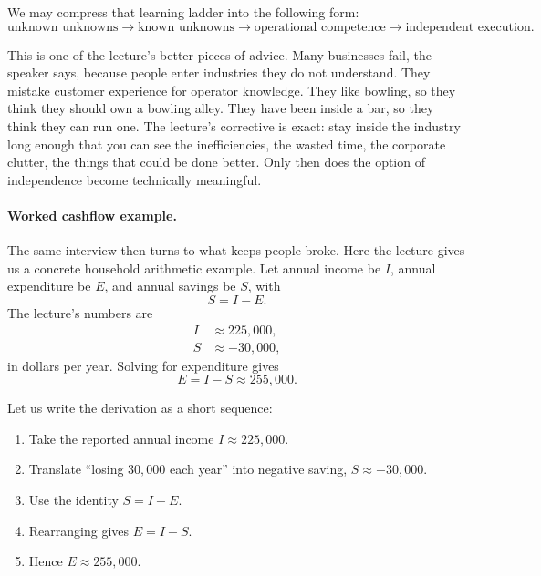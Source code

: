 We may compress that learning ladder into the following form:
\begin{equation}
\text{unknown unknowns} \to \text{known unknowns} \to \text{operational competence} \to \text{independent execution}.
\end{equation}

This is one of the lecture's better pieces of advice. Many businesses fail, the speaker says, because people enter industries they do not understand. They mistake customer experience for operator knowledge. They like bowling, so they think they should own a bowling alley. They have been inside a bar, so they think they can run one. The lecture's corrective is exact: stay inside the industry long enough that you can see the inefficiencies, the wasted time, the corporate clutter, the things that could be done better. Only then does the option of independence become technically meaningful.

\paragraph{Worked cashflow example.}
The same interview then turns to what keeps people broke. Here the lecture gives us a concrete household arithmetic example. Let annual income be \(I\), annual expenditure be \(E\), and annual savings be \(S\), with
\begin{equation}
S = I - E.
\end{equation}
The lecture's numbers are
\begin{align}
I &\approx 225{,}000,\\
S &\approx -30{,}000,
\end{align}
in dollars per year. Solving for expenditure gives
\begin{equation}
E = I - S \approx 255{,}000.
\end{equation}

Let us write the derivation as a short sequence:
\begin{enumerate}
\item Take the reported annual income \(I\approx 225{,}000\).
\item Translate ``losing \(30{,}000\) each year'' into negative saving, \(S\approx -30{,}000\).
\item Use the identity \(S=I-E\).
\item Rearranging gives \(E=I-S\).
\item Hence \(E\approx 255{,}000\).
\end{enumerate}

